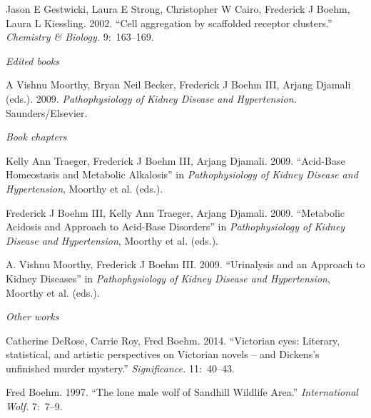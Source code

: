 \documentclass[11pt,article,oneside]{memoir}
\begin{document}
\ind Jason E Gestwicki, Laura E Strong, Christopher W Cairo, Frederick J Boehm, Laura L Kiessling. 2002. ``Cell aggregation by scaffolded receptor clusters.'' \emph{Chemistry \& Biology.} 9:~163--169.

\bigskip

\noindent\emph{Edited books \vspace{0.05in}}

\ind A Vishnu Moorthy, Bryan Neil Becker, Frederick J Boehm III, Arjang Djamali (eds.). 2009. \emph{Pathophysiology of Kidney Disease and Hypertension.} Saunders/Elsevier.

\bigskip

\noindent\emph{Book chapters \vspace{0.05in}}

\ind Kelly Ann Traeger, Frederick J Boehm III, Arjang Djamali. 2009. ``Acid-Base Homeostasis and Metabolic Alkalosis'' in \emph{Pathophysiology of Kidney Disease and Hypertension}, Moorthy et al. (eds.).

\ind Frederick J Boehm III, Kelly Ann Traeger, Arjang Djamali. 2009. ``Metabolic Acidosis and Approach to Acid-Base Disorders'' in \emph{Pathophysiology of Kidney Disease and Hypertension}, Moorthy et al. (eds.).

\ind A. Vishnu Moorthy, Frederick J Boehm III. 2009. ``Urinalysis and an Approach to Kidney Diseases'' in \emph{Pathophysiology of Kidney Disease and Hypertension}, Moorthy et al. (eds.).



\bigskip 

\noindent\emph{Other works \vspace{0.05in}}


\ind Catherine DeRose, Carrie Roy, Fred Boehm. 2014. ``Victorian eyes: Literary, statistical, and artistic perspectives on Victorian novels – and Dickens's unfinished murder mystery.'' \emph{Significance.} 11:~40--43.

\ind Fred Boehm. 1997. ``The lone male wolf of Sandhill Wildlife Area.'' \emph{International Wolf.} 7:~7--9.

 \bigskip
\end{document}
